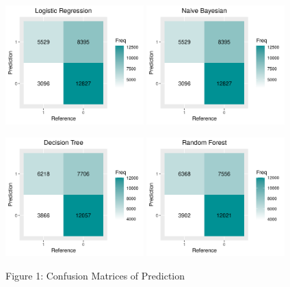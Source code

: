\documentclass[
]{article}
\begin{document}
\includegraphics[width=0.4\textwidth,height=\textheight]{pltcm_gg_glm.png}
\includegraphics[width=0.4\textwidth,height=\textheight]{pltcm_gg_nb.png}

\includegraphics[width=0.4\textwidth,height=\textheight]{pltcm_gg_rp.png}
\includegraphics[width=0.4\textwidth,height=\textheight]{pltcm_gg_rf.png}

Figure 1: Confusion Matrices of Prediction
\end{document}
